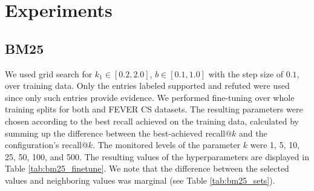 \chapter{Experiments}

\section{BM25}

We used grid search for $k_1 \in [0.2,2.0]$, $b\in[0.1,1.0]$ with the step size of $0.1$, over training data.
Only the entries labeled supported and refuted were used since only such entries provide evidence.
We performed fine-tuning over whole training splits for both \CTK{} and FEVER CS datasets.
The resulting parameters were chosen according to the best recall achieved on the training data, calculated by summing up the difference between the best-achieved recall$@k$ and the configuration's recall$@k$.
The monitored levels of the parameter $k$ were 1, 5, 10, 25, 50, 100, and 500. 
The resulting values of the hyperparameters are displayed in Table \ref{tab:bm25_finetune}. 
We note that the difference between the selected values and neighboring values was marginal (see Table \ref{tab:bm25_sets}). 
